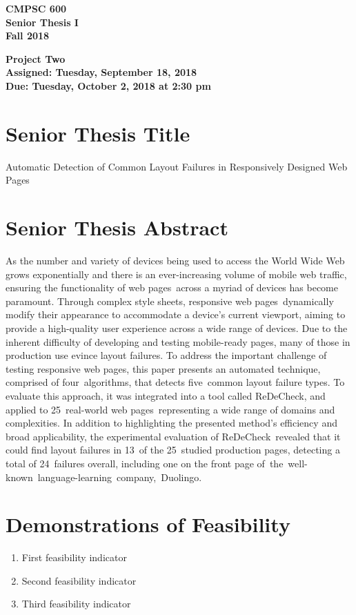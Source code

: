 \documentclass[11pt]{article}
\newcommand{\assignmentduedate}{October 2}
\newcommand{\assignmentassignedate}{September 18}
\newcommand{\assignmentnumber}{Two}
\newcommand{\labyear}{2018}
\newcommand{\labday}{Tuesday}
\newcommand{\labtime}{2:30 pm}
\newcommand{\assigneddate}{Assigned: \labday, \assignmentassignedate, \labyear{}}
\newcommand{\duedate}{Due: \labday, \assignmentduedate, \labyear{} at \labtime{}}
\newcommand{\projecttitle}[1]
{
  \begin{center}
    \begin{center}
      \bf
      CMPSC 600\\Senior Thesis I\\
      Fall 2018\\
      \medskip
    \end{center}
    \bf
    #1
  \end{center}
}
\newcommand{\webpages}{web pages\xspace}
\newcommand{\stylesheets}{style sheets\xspace}
\newcommand{\numtypes}{five\xspace}
\newcommand{\numalgorithms}{four\xspace}
\newcommand{\numsubjects}{25\xspace}
\newcommand{\totalfailures}{24\xspace}
\newcommand{\numpageswithfailures}{13\xspace}
\newcommand{\redecheck}{{\sc ReDeCheck}\xspace}
\begin{document}
\thispagestyle{empty}

\projecttitle{Project \assignmentnumber{} \\ \assigneddate{} \\ \duedate{}}

\section*{Senior Thesis Title}

\noindent
Automatic Detection of Common Layout Failures in Responsively Designed Web Pages

\section*{Senior Thesis Abstract}

As the number and variety of devices being used to access the World Wide Web grows exponentially and there is an
ever-increasing volume of mobile web traffic, ensuring the functionality of \webpages~across a myriad of devices has
become paramount. Through complex \stylesheets, responsive \webpages~dynamically modify their appearance to
accommodate a device's current viewport, aiming to provide a high-quality user experience across a wide range of
devices. Due to the inherent difficulty of developing and testing mobile-ready pages, many of those in production use
evince layout failures. To address the important challenge of testing responsive \webpages, this paper presents an
automated technique, comprised of \numalgorithms~algorithms, that detects \numtypes~common layout failure types. To
evaluate this approach, it was integrated into a tool called \mbox{\redecheck}, and applied to \numsubjects~real-world
\webpages~representing a wide range of domains and complexities. In addition to highlighting the presented method's
efficiency and broad applicability, the experimental evaluation of \redecheck~revealed that it could find layout
failures in \numpageswithfailures~of the \numsubjects~studied production pages, detecting a total of
\totalfailures~failures overall, including one on the front page of~\mbox{the well-known language-learning company,
Duolingo}.

\section*{Demonstrations of Feasibility}

\begin{enumerate}
  \item First feasibility indicator
  \item Second feasibility indicator
  \item Third feasibility indicator
\end{enumerate}
\end{document}
